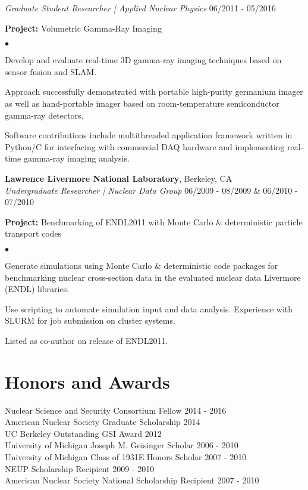 \documentclass[margin,line]{res}
\newenvironment{list1}{
  \begin{list}{\ding{113}}{%
      \setlength{\itemsep}{0in}
      \setlength{\parsep}{0in} \setlength{\parskip}{0in}
      \setlength{\topsep}{0in} \setlength{\partopsep}{0in} 
      \setlength{\leftmargin}{0.17in}}}{\end{list}}
\newenvironment{list2}{
  \begin{list}{$\bullet$}{%
      \setlength{\itemsep}{0in}
      \setlength{\parsep}{0in} \setlength{\parskip}{0in}
      \setlength{\topsep}{0in} \setlength{\partopsep}{0in} 
      \setlength{\leftmargin}{0.2in}}}{\end{list}}
\begin{document}
\begin{resume}
{\em Graduate Student Researcher | Applied Nuclear Physics} \hfill 06/2011 - 05/2016
\begin{list1}
  \item[] {\bf \small Project:} Volumetric Gamma-Ray Imaging
  \begin{list2}
    \item Develop and evaluate real-time 3D gamma-ray imaging techniques based
          on sensor fusion and SLAM.
    \item Approach successfully demonstrated with portable high-purity 
          germanium imager as well as hand-portable imager based on 
          room-temperature semiconductor gamma-ray detectors.
    \item Software contributions include multithreaded application framework
          written in Python/C for interfacing with commercial DAQ hardware and
          implementing real-time gamma-ray imaging analysis.
  \end{list2}
\end{list1}

{\bf Lawrence Livermore National Laboratory}, Berkeley, CA \\
{\em Undergraduate Researcher | Nuclear Data Group} \hfill 06/2009 - 08/2009 \& 06/2010 - 07/2010
\begin{list1}
  \item[] {\bf \small Project:} Benchmarking of ENDL2011 with Monte Carlo \& 
                                deterministic particle transport codes
  \begin{list2}
    \item Generate simulations using Monte Carlo \& deterministic code packages
          for benchmarking nuclear cross-section data in the evaluated nuclear
          data Livermore (ENDL) libraries.
    \item Use scripting to automate simulation input and data analysis.
          Experience with SLURM for job submission on cluster systems.
    \item Listed as co-author on release of ENDL2011.
  \end{list2}
\end{list1}



\section{\sc Honors and Awards} 

Nuclear Science and Security Consortium Fellow \hfill 2014 - 2016 \\
American Nuclear Society Graduate Scholarship \hfill 2014 \\
UC Berkeley Outstanding GSI Award \hfill 2012 \\
University of Michigan Joseph M. Geisinger Scholar \hfill 2006 - 2010 \\
University of Michigan Class of 1931E Honors Scholar \hfill 2007 - 2010 \\
NEUP Scholarship Recipient \hfill 2009 - 2010 \\
American Nuclear Society National Scholarship Recipient \hfill 2007 - 2010 \\


\end{resume}
\end{document}

